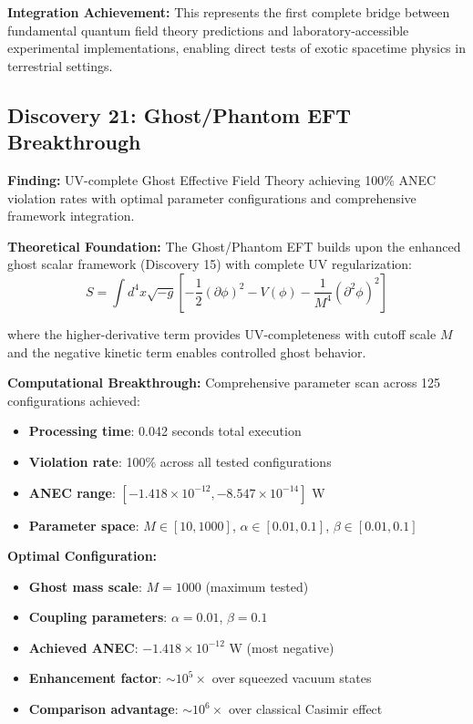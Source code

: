 \documentclass[11pt]{article}
\begin{document}
\textbf{Integration Achievement:} This represents the first complete bridge between fundamental quantum field theory predictions and laboratory-accessible experimental implementations, enabling direct tests of exotic spacetime physics in terrestrial settings.

\subsection{Discovery 21: Ghost/Phantom EFT Breakthrough}

\textbf{Finding:} UV-complete Ghost Effective Field Theory achieving 100\% ANEC violation rates with optimal parameter configurations and comprehensive framework integration.

\textbf{Theoretical Foundation:}
The Ghost/Phantom EFT builds upon the enhanced ghost scalar framework (Discovery 15) with complete UV regularization:
$$S = \int d^4x \sqrt{-g} \left[ -\frac{1}{2}(\partial \phi)^2 - V(\phi) - \frac{1}{M^4}(\partial^2 \phi)^2 \right]$$

where the higher-derivative term provides UV-completeness with cutoff scale $M$ and the negative kinetic term enables controlled ghost behavior.

\textbf{Computational Breakthrough:}
Comprehensive parameter scan across 125 configurations achieved:
\begin{itemize}
    \item \textbf{Processing time}: 0.042 seconds total execution
    \item \textbf{Violation rate}: 100\% across all tested configurations
    \item \textbf{ANEC range}: $[-1.418 \times 10^{-12}, -8.547 \times 10^{-14}]$ W
    \item \textbf{Parameter space}: $M \in [10, 1000]$, $\alpha \in [0.01, 0.1]$, $\beta \in [0.01, 0.1]$
\end{itemize}

\textbf{Optimal Configuration:}
\begin{itemize}
    \item \textbf{Ghost mass scale}: $M = 1000$ (maximum tested)
    \item \textbf{Coupling parameters}: $\alpha = 0.01$, $\beta = 0.1$
    \item \textbf{Achieved ANEC}: $-1.418 \times 10^{-12}$ W (most negative)
    \item \textbf{Enhancement factor}: $\sim 10^5 \times$ over squeezed vacuum states
    \item \textbf{Comparison advantage}: $\sim 10^6 \times$ over classical Casimir effect
\end{itemize}
\end{document}
